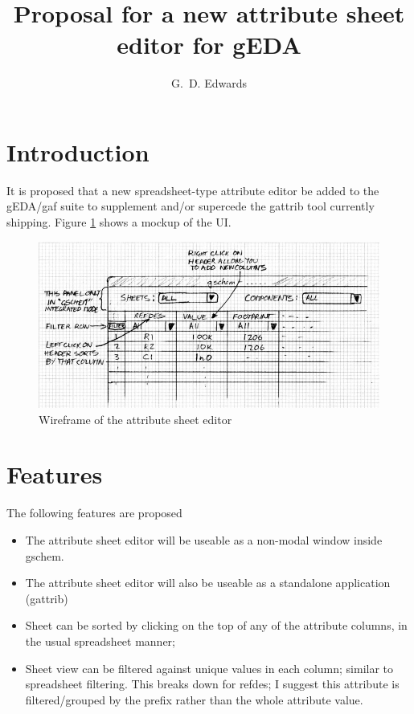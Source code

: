 \documentclass[a4,10pt]{article}
\title{Proposal for a new attribute sheet editor for gEDA}
\author{G.~D. Edwards}
\begin{document}
\maketitle
\section{Introduction}
It is proposed that a new spreadsheet-type attribute editor be added
to the gEDA/gaf suite to supplement and/or supercede the gattrib tool
currently shipping. Figure \ref{fig:wireframe} shows a mockup of the
UI.
\begin{figure}
\includegraphics{gattrib_evolution_wireframe_150.jpg}
\caption{Wireframe of the attribute sheet editor}
\label{fig:wireframe}
\end{figure}
\section{Features}
The following features are proposed
\begin{itemize}

\item The attribute sheet editor will be useable as a non-modal window
  inside gschem.

\item The attribute sheet editor will also be useable as a standalone
  application (gattrib)

\item Sheet can be sorted by clicking on the top of any of the
  attribute columns, in the usual spreadsheet manner;

\item Sheet view can be filtered against unique values in each column;
  similar to spreadsheet filtering. This breaks down for refdes; I
  suggest this attribute is filtered/grouped by the prefix rather than
  the whole attribute value.

\end{itemize}
%
\end{document}
